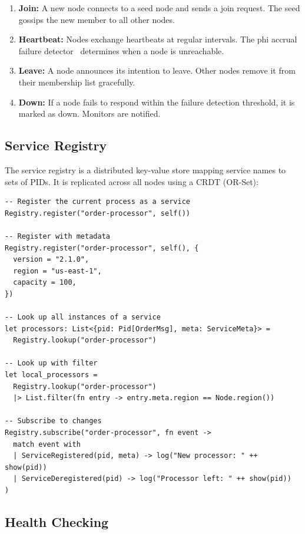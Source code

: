 \documentclass[11pt,a4paper]{article}
\begin{document}
\begin{enumerate}[nosep]
  \item \textbf{Join:} A new node connects to a seed node and sends a
        join request. The seed gossips the new member to all other nodes.
  \item \textbf{Heartbeat:} Nodes exchange heartbeats at regular intervals.
        The phi accrual failure detector~\citep{hayashibara2004phi}
        determines when a node is unreachable.
  \item \textbf{Leave:} A node announces its intention to leave. Other
        nodes remove it from their membership list gracefully.
  \item \textbf{Down:} If a node fails to respond within the failure
        detection threshold, it is marked as down. Monitors are notified.
\end{enumerate}

\subsection{Service Registry}

The service registry is a distributed key-value store mapping service
names to sets of PIDs. It is replicated across all nodes using a CRDT
(OR-Set):

\begin{lstlisting}
-- Register the current process as a service
Registry.register("order-processor", self())

-- Register with metadata
Registry.register("order-processor", self(), {
  version = "2.1.0",
  region = "us-east-1",
  capacity = 100,
})

-- Look up all instances of a service
let processors: List<{pid: Pid[OrderMsg], meta: ServiceMeta}> =
  Registry.lookup("order-processor")

-- Look up with filter
let local_processors =
  Registry.lookup("order-processor")
  |> List.filter(fn entry -> entry.meta.region == Node.region())

-- Subscribe to changes
Registry.subscribe("order-processor", fn event ->
  match event with
  | ServiceRegistered(pid, meta) -> log("New processor: " ++ show(pid))
  | ServiceDeregistered(pid) -> log("Processor left: " ++ show(pid))
)
\end{lstlisting}

\subsection{Health Checking}
\end{document}
